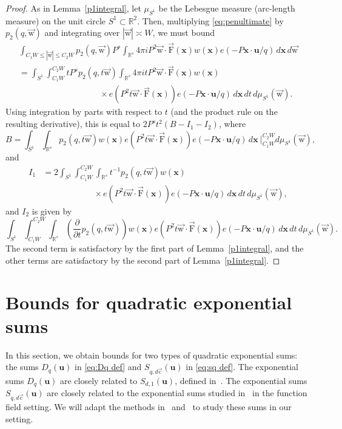 \documentclass[letterpaper,11pt]{amsart}
\numberwithin{equation}{section}
\theoremstyle{definition}
\numberwithin{equation}{section}
\newcommand{\RR}{\mathbb{R}}
\newcommand{\x}{\mathbf{x}}
\newcommand{\uu}{\mathbf{u}}
\newcommand{\uw}{{\vec{\mathrm{w}}}}
\newcommand{\uF}{{\vec{\mathrm{F}} }}
\newcommand{\uc}{{\vec{\mathrm{c}}}}
\newcommand{\R}{\mathbb{R}}
\newcommand{\nF}{\uF}
\begin{document}
\begin{proof}
	As in Lemma~\ref{p1integral}, let \(\mu_{S^1}\) be the Lebesgue measure (arc-length measure) on the unit circle \(S^1\subset \R^2\). Then, multiplying \eqref{eq:penultimate} by \( p_2(q,\uw)\)  and integrating over \(|\uw|\asymp W\), we must bound
	\begin{align*}
		&
        \int_{C_1W \leq |\uw|\leq C_2W} p_2(q,\uw)
		P^s  \int_{\R^s}
		4\pi i  P^2 \uw \cdot \nF(\x) w(\x) 
		e(-P\x\cdot\uu/q)\,
		d\x\,
		d\uw&
		\\
		&
        =
		\int_{S^1}
		\int_{C_1W}^{C_2W}
		tP^s p_2(q,t\uw) \int_{\R^s}
		4\pi i  t P^2 \uw \cdot \nF(\x) w(\x) &
		\\ & \hspace{4cm}
        \times e(P^2t\uw\cdot \nF(\x))
		e(-P\x\cdot\uu/q)\,
		d\x\, dt \,d\mu_{S^1}(\uw).&
	\end{align*}
        Using integration by parts with respect to \(t\) (and the product rule on the resulting derivative), this is equal to
$2P^st^2(B-I_1-I_2)$, where
		$$
		B=
		\int_{S^1}
		\int_{\RR^s} 
		p_2(q,t\uw)
		 w(\x) 
		e(P^2t\uw\cdot \nF(\x))
		e(-P\x\cdot\uu/q)\,
		d\x\
		\Big \vert_{C_1W}^{C_2W}d\mu_{S^1}(\uw),$$
        and
		\begin{align*}
		    I_1&=  2
		\int_{S^1}
		\int_{C_1W}^{C_2W}\int_{\RR^s}
		t^{-1}
		p_2(q,t\uw)
		w(\x) 
		\\ & \quad \quad \quad \quad \quad \quad \times e(P^2t\uw\cdot \nF(\x))
		e(-P\x\cdot\uu/q)\,
		d\x\, dt \,d\mu_{S^1}(\uw),
		\end{align*}
		and 
		$I_2$ is given by $$
		\int_{S^1}
		\int_{C_1W}^{C_2W}
		\int_{\RR^s}
		\left(
		\frac{\partial}{\partial t}
		p_2(q,t\uw)
		\right)
		w(\x)  e(P^2t\uw\cdot \nF(\x))
		e(-P\x\cdot\uu/q)\,
		d\x\, dt \,d\mu_{S^1}(\uw)
		\label{eq:Iq-change-vars}.
	$$
	The second term is satisfactory by the first part of Lemma~\ref{p1integral}, and the other terms are satisfactory by the second part of Lemma~\ref{p1integral}.
\end{proof}



\section{Bounds for quadratic exponential sums}\label{sec:exp sum}	In this section, we obtain bounds for two types of quadratic exponential sums: the sums $D_q(\uu)$ in \eqref{eq:Dq def} and $S_{q,d\uc}(\uu)$ in \eqref{eq:sq def}.  The exponential sums $D_q(\uu)$ are closely related to $S_{d,1}(\uu)$, defined in~\cite[eq. (1.2)]{BM}. The exponential sums $S_{q,d\uc}(\uu)$ are closely related to the exponential sums studied in~\cite{V19} in the function field setting. We will adapt the methods in~\cite{BM} and~\cite{V19} to study these sums in our setting.  
\end{document}
